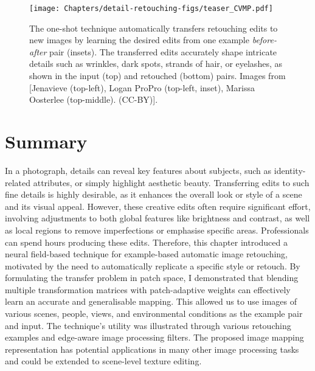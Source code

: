 \begin{figure}
  \texttt{[image: Chapters/detail-retouching-figs/teaser\_CVMP.pdf]}
  \caption{The one-shot technique automatically transfers retouching edits to new images by learning the desired edits from one example \textit{before-after} pair (insets). The transferred edits accurately shape intricate details such as wrinkles, dark spots, strands of hair, or eyelashes, as shown in the input (top) and retouched (bottom) pairs. Images from [Jenavieve (top-left), Logan ProPro (top-left, inset), Marissa Oosterlee (top-middle). (CC-BY)].}
  \label{fig:DRteaser}
\end{figure}
















\section{Summary}
In a photograph, details can reveal key features about subjects, such as identity-related attributes, or simply highlight aesthetic beauty. Transferring edits to such fine details is highly desirable, as it enhances the overall look or style of a scene and its visual appeal. However, these creative edits often require significant effort, involving adjustments to both global features like brightness and contrast, as well as local regions to remove imperfections or emphasise specific areas. Professionals can spend hours producing these edits. Therefore, this chapter introduced a neural field-based technique for example-based automatic image retouching, motivated by the need to automatically replicate a specific style or retouch. By formulating the transfer problem in patch space, I demonstrated that blending multiple transformation matrices with patch-adaptive weights can effectively learn an accurate and generalisable mapping. This allowed us to use images of various scenes, people, views, and environmental conditions as the example pair and input. The technique's utility was illustrated through various retouching examples and edge-aware image processing filters. The proposed image mapping representation has potential applications in many other image processing tasks and could be extended to scene-level texture editing.

